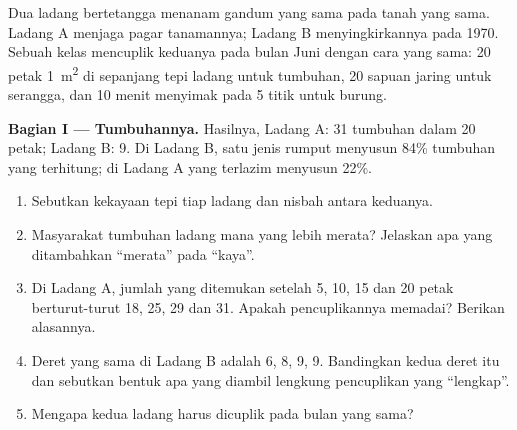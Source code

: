 \begin{problem}
\label{pb:g10:biodiversity-scales:1}
Dua ladang bertetangga menanam gandum yang sama pada tanah yang sama.
Ladang A menjaga pagar tanamannya; Ladang B menyingkirkannya pada 1970.
Sebuah kelas mencuplik keduanya pada bulan Juni dengan cara yang sama:
20 petak \qty{1}{m^2} di sepanjang tepi ladang untuk tumbuhan, 20
sapuan jaring untuk serangga, dan 10 menit menyimak pada 5 titik untuk burung.

\medskip
\noindent\textbf{Bagian I --- Tumbuhannya.}
Hasilnya, Ladang A: 31  tumbuhan dalam 20 petak; Ladang B: 9.
Di Ladang B, satu jenis rumput menyusun 84\% tumbuhan yang terhitung;
di Ladang A  yang terlazim menyusun 22\%.
\begin{enumerate}
  \item Sebutkan kekayaan  tepi tiap ladang dan nisbah antara
        keduanya.
  \item Masyarakat tumbuhan ladang mana yang lebih merata? Jelaskan apa
        yang ditambahkan ``merata'' pada ``kaya''.
  \item Di Ladang A, jumlah  yang ditemukan setelah 5, 10, 15
        dan 20 petak berturut-turut 18, 25, 29 dan 31. Apakah
        pencuplikannya memadai? Berikan alasannya.
  \item Deret yang sama di Ladang B adalah 6, 8, 9, 9. Bandingkan kedua
        deret itu dan sebutkan bentuk apa yang diambil lengkung
        pencuplikan yang ``lengkap''.
  \item Mengapa kedua ladang harus dicuplik pada bulan yang sama?
\end{enumerate}


\end{problem}
